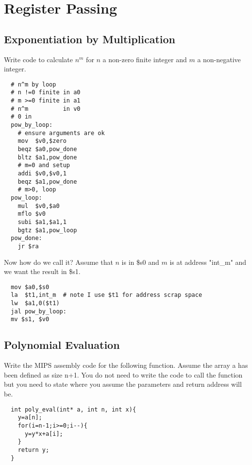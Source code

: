 \section{Register Passing}

\subsection{Exponentiation by Multiplication}

Write code to calculate $n^m$ for $n$ a non-zero finite integer and $m$ a non-negative integer.

\begin{verbatim}
  # n^m by loop
  # n !=0 finite in a0
  # m >=0 finite in a1
  # n^m          in v0
  # 0 in
  pow_by_loop:
    # ensure arguments are ok
    mov  $v0,$zero
    beqz $a0,pow_done
    bltz $a1,pow_done
    # m=0 and setup
    addi $v0,$v0,1
    beqz $a1,pow_done
    # m>0, loop
  pow_loop:
    mul  $v0,$a0
    mflo $v0
    subi $a1,$a1,1
    bgtz $a1,pow_loop
  pow_done:
    jr $ra
\end{verbatim}


Now how do we call it?  Assume that $n$ is in \$s0 and $m$ is at address "int\_m" and we want the result in \$s1.

\begin{verbatim}
  mov $a0,$s0
  la  $t1,int_m  # note I use $t1 for address scrap space
  lw  $a1,0($t1)
  jal pow_by_loop:
  mv $s1, $v0
\end{verbatim}




\subsection{Polynomial Evaluation}

Write the MIPS assembly code for the following function.  Assume the array a has been defined as size n+1.  You do not need to write the code to call the function but you need to state where you assume the parameters and return address will be.

\begin{verbatim}
  int poly_eval(int* a, int n, int x){
    y=a[n];
    for(i=n-1;i>=0;i--){
      y=y*x+a[i];
    }
    return y;
  }
\end{verbatim}

